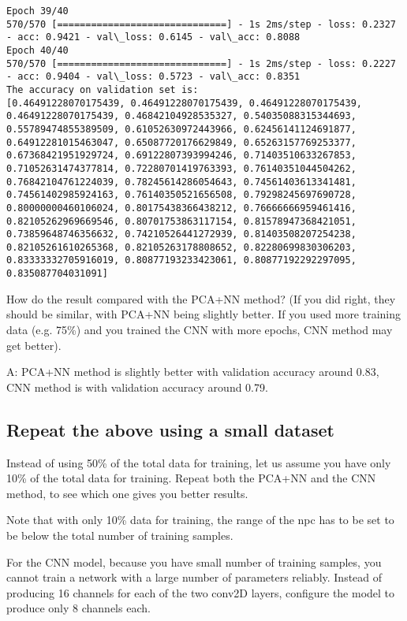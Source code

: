 \documentclass[11pt]{article}
\begin{document}
\begin{Verbatim}[commandchars=\\\{\}]
Epoch 39/40
570/570 [==============================] - 1s 2ms/step - loss: 0.2327 - acc: 0.9421 - val\_loss: 0.6145 - val\_acc: 0.8088
Epoch 40/40
570/570 [==============================] - 1s 2ms/step - loss: 0.2227 - acc: 0.9404 - val\_loss: 0.5723 - val\_acc: 0.8351
The accuracy on validation set is:
[0.46491228070175439, 0.46491228070175439, 0.46491228070175439, 0.46491228070175439, 0.46842104928535327, 0.54035088315344693, 0.55789474855389509, 0.61052630972443966, 0.62456141124691877, 0.64912281015463047, 0.65087720176629849, 0.65263157769253377, 0.67368421951929724, 0.69122807393994246, 0.71403510633267853, 0.71052631474377814, 0.72280701419763393, 0.76140351044504262, 0.76842104761224039, 0.78245614286054643, 0.74561403613341481, 0.74561402985924163, 0.76140350521656508, 0.79298245697690728, 0.80000000460106024, 0.80175438366438212, 0.76666666959461416, 0.82105262969669546, 0.80701753863117154, 0.81578947368421051, 0.73859648746356632, 0.74210526441272939, 0.81403508207254238, 0.82105261610265368, 0.82105263178808652, 0.82280699830306203, 0.83333332705916019, 0.80877193233423061, 0.80877192292297095, 0.835087704031091]

    \end{Verbatim}

    How do the result compared with the PCA+NN method? (If you did right,
they should be similar, with PCA+NN being slightly better. If you used
more training data (e.g. 75\%) and you trained the CNN with more epochs,
CNN method may get better).

    A: PCA+NN method is slightly better with validation accuracy around
0.83, CNN method is with validation accuracy around 0.79.

    \subsection{Repeat the above using a small
dataset}\label{repeat-the-above-using-a-small-dataset}

Instead of using 50\% of the total data for training, let us assume you
have only 10\% of the total data for training. Repeat both the PCA+NN
and the CNN method, to see which one gives you better results.

Note that with only 10\% data for training, the range of the npc has to
be set to be below the total number of training samples.

For the CNN model, because you have small number of training samples,
you cannot train a network with a large number of parameters reliably.
Instead of producing 16 channels for each of the two conv2D layers,
configure the model to produce only 8 channels each.
\end{document}
